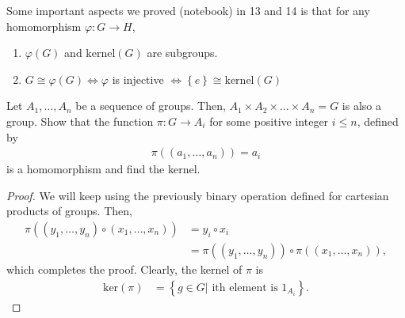 \documentclass[12pt]{article}
\newenvironment{problem}[2][Problem]{\begin{trivlist} \item[\hskip \labelsep {\bfseries #1}\hskip \labelsep {\bfseries #2.}]}{\end{trivlist}}
\begin{document}
Some important aspects we proved (notebook) in 13 and 14 is that for any homomorphism $\varphi: G\to H$, 
\begin{enumerate}
  \item $\varphi(G)$ and $\text{kernel}(G)$ are subgroups.
  \item $G\cong \varphi(G) \iff \varphi$ is injective $\iff \left\{ e \right\} \cong \text{kernel}(G)$
\end{enumerate}
\begin{problem}{IV}
  Let $A_{1},\dots,A_{n}$ be a sequence of groups. Then, $A_{1}\times A_{2}\times \dots \times A_{n}=G$ is also a group. Show that the function $\pi:G\to A_{i}$ for some positive integer $i\leq n$, defined by
\begin{align*}
  \pi\left( (a_{1},\dots,a_{n} ) \right) = a_{i}
\end{align*}
is a homomorphism and find the kernel.
\begin{proof}
  We will keep using the previously binary operation defined for cartesian products of groups. Then,
\begin{align*}
  \pi( (y_{1},\dots,y_{n}) \circ (x_{1},\dots,x_{n}) ) &= y_{i}\circ x_{i}\\
  &= \pi( (y_{1},\dots, y_{n}) ) \circ \pi( (x_{1}, \dots, x_{n}) ),
\end{align*}
which completes the proof. Clearly, the kernel of $\pi$ is 
\begin{align*}
  \text{ker}(\pi) &= \left\{ g\in G | \text{ ith element is }1_{A_{i}} \right\}.
\end{align*}
\end{proof}
\end{problem}
\end{document}
